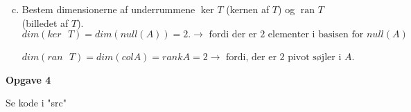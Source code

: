 \documentclass[12pt,a4paper]{article}
\begin{document}
\begin{enumerate}[(a)]
\setcounter{enumi}{2}

\item Bestem dimensionerne af underrummene $\operatorname{ker}\mspace{1mu}T$ (kernen af $T$) og $\operatorname{ran}\mspace{1mu}
T$ (billedet af $T$). \\

$dim(ker \text{ } T) = dim( null(A) ) = 2. \rightarrow \text{ fordi der er 2 elementer i basisen for } null(A)$

$dim(ran \text{ } T) = dim(col A) = rank A = 2 \rightarrow \text{ fordi, der er 2 pivot søjler i } A $.


\end{enumerate}



{\bf Opgave 4 \ }

Se kode i "src"
\end{document}
